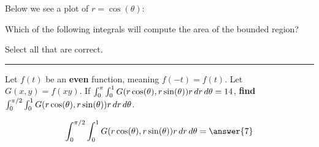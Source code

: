 \documentclass{ximera}
\begin{document}
\begin{problem}
  Below we see a plot of $r = \cos(\theta)$:
  \begin{image}[2in]
\end{image}
  Which of the following integrals will compute the area of the bounded region?
  \begin{onlineOnly}
    Select all that are correct.
  \end{onlineOnly}
\begin{selectAll}
\end{selectAll}
\end{problem}

\hrule

\begin{problem}
  Let $f(t)$ be an \textbf{even} function, meaning $f(-t) = f(t)$. Let $G(x,y)
  = f(xy)$. If $\int_{0}^{\pi} \int_0^1 G(r \cos(\theta),r\sin(\theta))r\mathop{}\!d r\mathop{}\!d\theta = 14$, \textbf{find}  $\int_{0}^{\pi/2} \int_0^1 G(r \cos(\theta),r\sin(\theta))r\mathop{}\!d r\mathop{}\!d\theta$.
  \begin{prompt}
  \[
  \int_{0}^{\pi/2} \int_0^1 G(r \cos(\theta),r\sin(\theta))r\d r\d\theta = \answer{7}
  \]
  \end{prompt}
\end{problem}

\vfill
\end{document}
